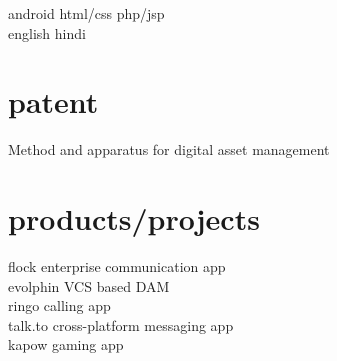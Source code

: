 \begin{minipage}[t]{0.32\textwidth}
android \textbullet{} html/css \textbullet{} php/jsp \\
english \textbullet{} hindi\\ 

\sectionspace %


\section{patent}
\location{}
Method and apparatus for digital asset management \href{https://patents.google.com/patent/US8868506B1/en?inventor=Kunjan+Aggarwal}{\faChain}
\sectionspace %


\section{products/projects}
flock enterprise communication app \href{https://flock.com}{\faChain} \\
evolphin VCS based DAM \href{https://evolphin.com/}{\faChain} \\
ringo calling app \href{https://www.ringo.co/}{\faChain}\\
talk.to cross-platform messaging app \\
kapow gaming app \\

\end{minipage} %
\hspace{.01\textwidth}
%
%
